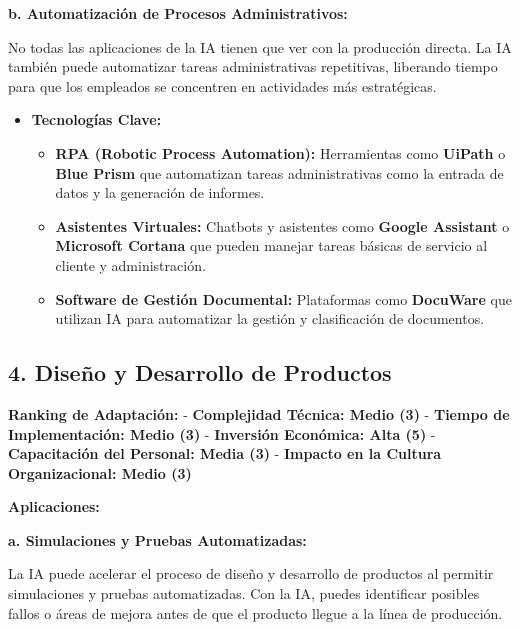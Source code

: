 \documentclass[
  10pt,
  letterpaper,
]{book}
\providecommand{\tightlist}{%
  \setlength{\itemsep}{0pt}\setlength{\parskip}{0pt}}\usepackage{longtable,booktabs,array}
\begin{document}
\textbf{b. Automatización de Procesos Administrativos:}

No todas las aplicaciones de la IA tienen que ver con la producción
directa. La IA también puede automatizar tareas administrativas
repetitivas, liberando tiempo para que los empleados se concentren en
actividades más estratégicas.

\begin{itemize}
\tightlist
\item
  \textbf{Tecnologías Clave:}

  \begin{itemize}
  \tightlist
  \item
    \textbf{RPA (Robotic Process Automation):} Herramientas como
    \textbf{UiPath} o \textbf{Blue Prism} que automatizan tareas
    administrativas como la entrada de datos y la generación de
    informes.
  \item
    \textbf{Asistentes Virtuales:} Chatbots y asistentes como
    \textbf{Google Assistant} o \textbf{Microsoft Cortana} que pueden
    manejar tareas básicas de servicio al cliente y administración.
  \item
    \textbf{Software de Gestión Documental:} Plataformas como
    \textbf{DocuWare} que utilizan IA para automatizar la gestión y
    clasificación de documentos.
  \end{itemize}
\end{itemize}

\subsection{\texorpdfstring{4. \textbf{Diseño y Desarrollo de
Productos}}{4. Diseño y Desarrollo de Productos}}\label{diseuxf1o-y-desarrollo-de-productos}

\textbf{Ranking de Adaptación:} - \textbf{Complejidad Técnica: Medio
(3)} - \textbf{Tiempo de Implementación: Medio (3)} - \textbf{Inversión
Económica: Alta (5)} - \textbf{Capacitación del Personal: Media (3)} -
\textbf{Impacto en la Cultura Organizacional: Medio (3)}

\textbf{Aplicaciones:}

\textbf{a. Simulaciones y Pruebas Automatizadas:}

La IA puede acelerar el proceso de diseño y desarrollo de productos al
permitir simulaciones y pruebas automatizadas. Con la IA, puedes
identificar posibles fallos o áreas de mejora antes de que el producto
llegue a la línea de producción.
\end{document}
